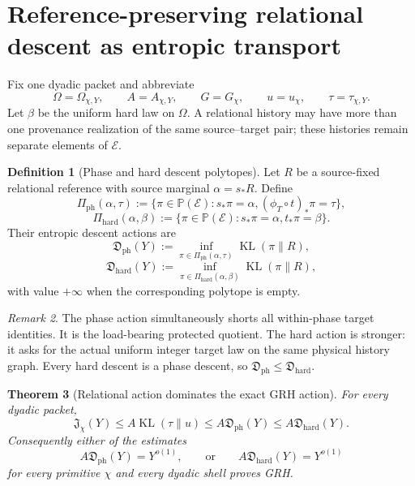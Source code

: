 \documentclass[11pt]{article}
\newtheorem{theorem}{Theorem}[section]
\theoremstyle{definition}
\newtheorem{definition}[theorem]{Definition}
\theoremstyle{remark}
\newtheorem{remark}[theorem]{Remark}
\newcommand{\Prob}{\mathbb P}
\newcommand{\KL}{\operatorname{KL}}
\newcommand{\Phase}{\mathrm{ph}}
\newcommand{\Hard}{\mathrm{hard}}
\begin{document}
\section{Reference-preserving relational descent as entropic transport}
\label{sec:entropic-descent}

Fix one dyadic packet and abbreviate
\[
 \Omega=\Omega_{\chi,Y},\qquad A=A_{\chi,Y},
 \qquad G=G_\chi,\qquad u=u_\chi,\qquad\tau=\tau_{\chi,Y}.
\]
Let $\beta$ be the uniform hard law on $\Omega$.  A relational history may have
more than one provenance realization of the same source--target pair; these
histories remain separate elements of $\mathcal E$.

\begin{definition}[Phase and hard descent polytopes]
Let $R$ be a source-fixed relational reference with source marginal
$\alpha=s_*R$.  Define
\[
 \Pi_{\Phase}(\alpha,\tau)
 :=\{\pi\in\Prob(\mathcal E):
      s_*\pi=\alpha,
      (\phi_T\circ t)_*\pi=\tau\},
 \tag{4.1}
\]
\[
 \Pi_{\Hard}(\alpha,\beta)
 :=\{\pi\in\Prob(\mathcal E):
      s_*\pi=\alpha,
      t_*\pi=\beta\}.
 \tag{4.2}
\]
Their entropic descent actions are
\[
 \boxed{
 \mathfrak D_{\Phase}(Y)
 :=\inf_{\pi\in\Pi_{\Phase}(\alpha,\tau)}\KL(\pi\|R),}
 \tag{4.3}
\]
\[
 \boxed{
 \mathfrak D_{\Hard}(Y)
 :=\inf_{\pi\in\Pi_{\Hard}(\alpha,\beta)}\KL(\pi\|R),}
 \tag{4.4}
\]
with value $+\infty$ when the corresponding polytope is empty.
\end{definition}

\begin{remark}
The phase action simultaneously shorts all within-phase target identities.  It
is the load-bearing protected quotient.  The hard action is stronger: it asks
for the actual uniform integer target law on the same physical history graph.
Every hard descent is a phase descent, so
$\mathfrak D_{\Phase}\le\mathfrak D_{\Hard}$.
\end{remark}

\begin{theorem}[Relational action dominates the exact GRH action]
\label{thm:relational-dominates-phase}
For every dyadic packet,
\[
 \boxed{
 \mathfrak J_\chi(Y)
 \le A\KL(\tau\|u)
 \le A\mathfrak D_{\Phase}(Y)
 \le A\mathfrak D_{\Hard}(Y).}
 \tag{4.5}
\]
Consequently either of the estimates
\[
 A\mathfrak D_{\Phase}(Y)=Y^{o(1)},
 \qquad\text{or}\qquad
 A\mathfrak D_{\Hard}(Y)=Y^{o(1)}
 \tag{4.6}
\]
for every primitive $\chi$ and every dyadic shell proves GRH.
\end{theorem}
\end{document}

